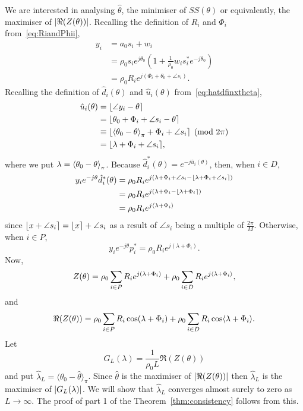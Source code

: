 \documentclass[journal]{IEEEtran}
\begin{document}
We are interested in analysing $\hat{\theta}$, the minimiser of $SS(\theta)$ or equivalently, the maximiser of ${\left\vert \Re(Z(\theta)) \right\vert}$.  Recalling the definition of $R_i$ and $\Phi_i$ from~\eqref{eq:RiandPhii},
\begin{align*}
y_i &= a_0 s_i + w_i \\
&= \rho_0 s_i e^{j \theta_0}\left( 1 + \frac{1}{\rho_0} w_i s_i^* e^{-j \theta_0} \right) \\
&= \rho_0 R_i e^{j ( \Phi_i + \theta_0 + \angle{s_i}) }.
\end{align*}
Recalling the definition of $\hat{d}_i(\theta)$ and $\hat{u}_i(\theta)$ from~\eqref{eq:hatdfinxtheta},
\begin{align*}
\hat{u}_i(\theta) &= {\left\lfloor \angle{y_i} - \theta \right\rceil} \\
&= {\left\lfloor \theta_0 + \Phi_i + \angle{s_i} - \theta \right\rceil} \\
&\equiv {\left\lfloor  \left\langle \theta_0 - \theta \right\rangle_{\pi} + \Phi_i + \angle{s_i} \right\rceil} \pmod{2\pi} \\
&= {\left\lfloor  \lambda + \Phi_i + \angle{s_i}  \right\rceil},
\end{align*}
where we put $\lambda = \left\langle \theta_0 - \theta \right\rangle_\pi$.  Because $\hat{d}_i^*(\theta) = e^{-j\hat{u}_i(\theta)}$, then, when $i \in D$,
\begin{align*}
 y_i e^{-j\theta} \hat{d}_i^*(\theta) &= \rho_0 R_i e^{j(\lambda + \Phi_i + \angle{s_i} - {\left\lfloor \lambda + \Phi_i + \angle{s_i} \right\rceil})} \\
&= \rho_0 R_i e^{j(\lambda + \Phi_i - {\left\lfloor \lambda + \Phi_i \right\rceil})} \\
&= \rho_0 R_i e^{j\langle \lambda + \Phi_i \rangle}
\end{align*}
since ${\left\lfloor x + \angle{s_i} \right\rceil} = {\left\lfloor x \right\rceil} + \angle{s_i}$ as a result of $\angle{s_i}$ being a multiple of $\tfrac{2\pi}{M}$.  Otherwise, when $i \in P$,  
\[
y_i e^{-j\theta} p_i^* = \rho_0 R_i e^{j(\lambda + \Phi_i)}.
\]
Now,
\[
Z(\theta) = \rho_0 \sum_{i \in P} R_i e^{j(\lambda + \Phi_i)} + \rho_0  \sum_{i \in D} R_i e^{j\langle \lambda + \Phi_i \rangle},
\]
and
\[
\Re(Z(\theta)) = \rho_0 \sum_{i \in P} R_i \cos(\lambda + \Phi_i) + \rho_0 \sum_{i \in D} R_i \cos\langle \lambda + \Phi_i \rangle.
\] 
Let 
\begin{equation}\label{eq:GLdefn}
G_L(\lambda) = \frac{1}{\rho_0 L} \Re(Z(\theta))
\end{equation}
and put $\hat{\lambda}_L = \langle\theta_0 - \hat{\theta}\rangle_\pi$.  Since $\hat{\theta}$ is the maximiser of ${\left\vert \Re(Z(\theta)) \right\vert}$ then  $\hat{\lambda}_L$ is the maximiser of ${\left\vert G_L(\lambda) \right\vert}$.  We will show that $\hat{\lambda}_L$ converges almost surely to zero as $L \rightarrow \infty$.  The proof of part 1 of the Theorem~\ref{thm:consistency} follows from this.
\end{document}
